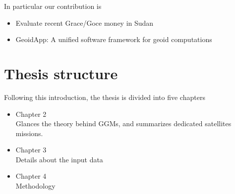 In particular our contribution is
\begin{itemize}
	\item Evaluate recent Grace/Goce money in Sudan
	\item GeoidApp: A unified software framework for geoid computations
\end{itemize}


\section{Thesis structure}
Following this introduction, the thesis is divided into five chapters

\begin{itemize}
	\item Chapter 2\\
	Glances the theory behind GGMs, and summarizes dedicated satellites missions.
	\item Chapter 3\\
	Details about the input data
	\item Chapter 4\\
	Methodology
	
	
	
\end{itemize}
